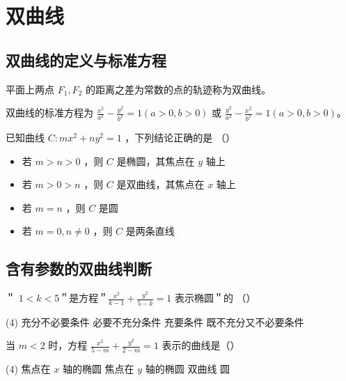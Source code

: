\section{双曲线}

\subsection{双曲线的定义与标准方程}

\begin{definition}
    平面上两点 $F_1, F_2$ 的距离之差为常数的点的轨迹称为双曲线。
\end{definition}

\begin{theorem}
    双曲线的标准方程为 $\frac{x^2}{a^2} - \frac{y^2}{b^2} = 1 (a>0, b>0)$ 或 $\frac{y^2}{a^2} - \frac{x^2}{b^2} = 1 (a>0, b>0)$。
\end{theorem}

\begin{example}
    已知曲线 $C: m x^2+n y^2=1$ ，下列结论正确的是 （\qquad）
    \begin{itemize}
        \item 若 $m>n>0$ ，则 $C$ 是椭圆，其焦点在 $y$ 轴上
        \item 若 $m>0>n$ ，则 $C$ 是双曲线，其焦点在 $x$ 轴上
        \item 若 $m=n$ ，则 $C$ 是圆
        \item 若 $m=0, n \neq 0$ ，则 $C$ 是两条直线
    \end{itemize}
\end{example}

\vspace{10em}

\subsection{含有参数的双曲线判断}

\begin{example}
    ＂ $1<k<5$＂是方程＂$\frac{x^2}{k-1}+\frac{y^2}{5-k}=1$ 表示椭圆＂的 （\qquad）
    \begin{tasks}(4)
        \task 充分不必要条件
        \task 必要不充分条件
        \task 充要条件
        \task 既不充分又不必要条件
    \end{tasks}
\end{example}

\vspace{10em}

\begin{example}
    当 $m<2$ 时，方程 $\frac{x^2}{5-m}+\frac{y^2}{2-m}=1$ 表示的曲线是（\qquad）
    \begin{tasks}(4)
        \task 焦点在 $x$ 轴的椭圆
        \task 焦点在 $y$ 轴的椭圆
        \task 双曲线
        \task 圆
    \end{tasks}
\end{example}

